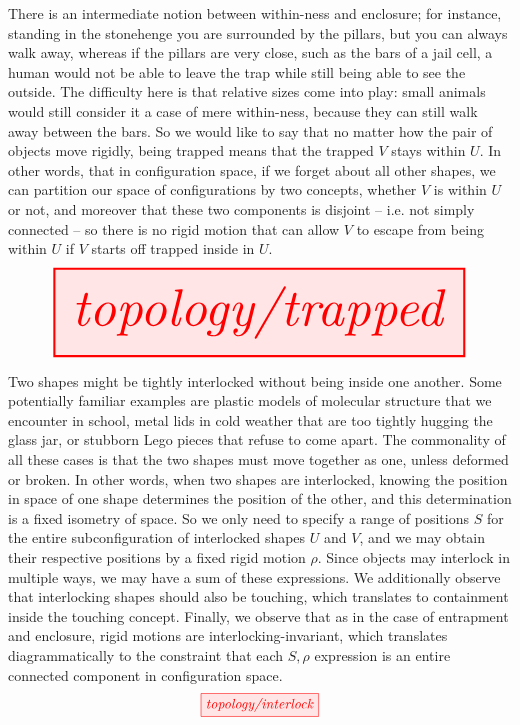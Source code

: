 \begin{myboxB}
\begin{defn}[Trapping]\label{defn:trapped}
There is an intermediate notion between within-ness and enclosure; for instance, standing in the stonehenge you are surrounded by the pillars, but you can always walk away, whereas if the pillars are very close, such as the bars of a jail cell, a human would not be able to leave the trap while still being able to see the outside. The difficulty here is that relative sizes come into play: small animals would still consider it a case of mere within-ness, because they can still walk away between the bars. So we would like to say that no matter how the pair of objects move rigidly, being trapped means that the trapped $V$ stays within $U$. In other words, that in configuration space, if we forget about all other shapes, we can partition our space of configurations by two concepts, whether $V$ is within $U$ or not, and moreover that these two components is disjoint -- i.e. not simply connected -- so there is no rigid motion that can allow $V$ to escape from being within $U$ if $V$ starts off trapped inside in $U$.
\[\resizebox{\textwidth}{!}{\tikzfig{topology/trapped}}\]
\end{defn}
\end{myboxB}

\begin{myboxR}
\begin{defn}[Interlock]\label{defn:interlocked}
Two shapes might be tightly interlocked without being inside one another. Some potentially familiar examples are plastic models of molecular structure that we encounter in school, metal lids in cold weather that are too tightly hugging the glass jar, or stubborn Lego pieces that refuse to come apart. The commonality of all these cases is that the two shapes must move together as one, unless deformed or broken. In other words, when two shapes are interlocked, knowing the position in space of one shape determines the position of the other, and this determination is a fixed isometry of space. So we only need to specify a range of positions $S$ for the entire subconfiguration of interlocked shapes $U$ and $V$, and we may obtain their respective positions by a fixed rigid motion $\rho$. Since objects may interlock in multiple ways, we may have a sum of these expressions. We additionally observe that interlocking shapes should also be touching, which translates to containment inside the touching concept. Finally, we observe that as in the case of entrapment and enclosure, rigid motions are interlocking-invariant, which translates diagrammatically to the constraint that each $S,\rho$ expression is an entire connected component in configuration space.
\[\tikzfig{topology/interlock}\]
\end{defn}
\end{myboxR}

